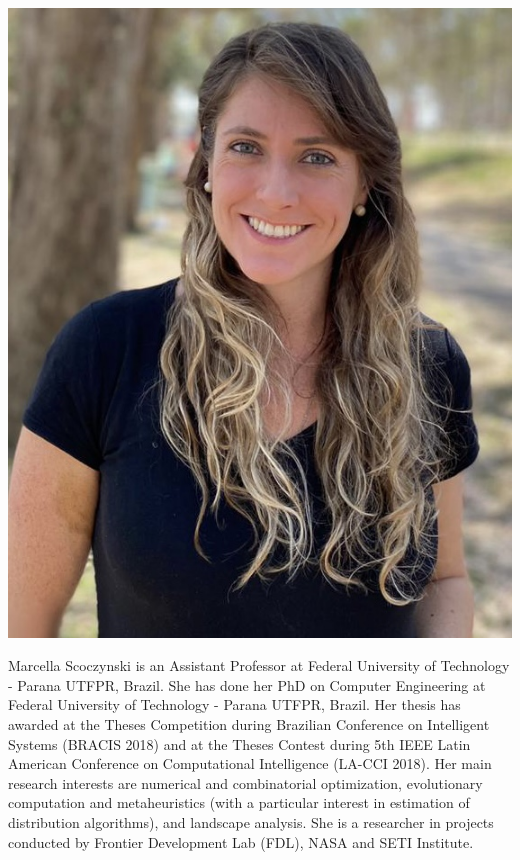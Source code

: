 \newpage

\

\vspace{3cm}
\begin{center}
\includegraphics[width=.3\textwidth]{Photos/mar2022.jpg}
\end{center}

Marcella Scoczynski is an Assistant Professor at Federal University of Technology - Parana UTFPR, Brazil. She has done her PhD on Computer Engineering at Federal University of Technology - Parana UTFPR, Brazil. Her thesis has awarded at the Theses Competition during Brazilian Conference on Intelligent Systems (BRACIS 2018) and at the Theses Contest during 5th IEEE Latin American Conference on Computational Intelligence (LA-CCI 2018). Her main research interests are numerical and combinatorial optimization, evolutionary computation and metaheuristics (with a particular interest in estimation of distribution algorithms), and landscape analysis. She is a researcher in projects conducted by Frontier Development Lab (FDL), NASA and SETI Institute. 


